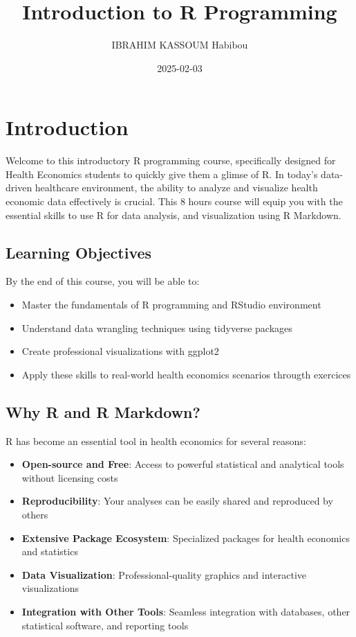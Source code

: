 \documentclass[
]{book}
\title{Introduction to R Programming}
\author{IBRAHIM KASSOUM Habibou}
\date{2025-02-03}
\providecommand{\tightlist}{%
  \setlength{\itemsep}{0pt}\setlength{\parskip}{0pt}}
\begin{document}
\maketitle

{
\setcounter{tocdepth}{1}
\tableofcontents
}
\chapter{Introduction}\label{introduction}

Welcome to this introductory R programming course, specifically designed for Health Economics students to quickly give them a glimse of R. In today's data-driven healthcare environment, the ability to analyze and visualize health economic data effectively is crucial. This 8 hours course will equip you with the essential skills to use R for data analysis, and visualization using R Markdown.

\section{Learning Objectives}\label{learning-objectives}

By the end of this course, you will be able to:

\begin{itemize}
\tightlist
\item
  Master the fundamentals of R programming and RStudio environment
\item
  Understand data wrangling techniques using tidyverse packages
\item
  Create professional visualizations with ggplot2
\item
  Apply these skills to real-world health economics scenarios througth exercices
\end{itemize}

\section{Why R and R Markdown?}\label{why-r-and-r-markdown}

R has become an essential tool in health economics for several reasons:

\begin{itemize}
\tightlist
\item
  \textbf{Open-source and Free}: Access to powerful statistical and analytical tools without licensing costs
\item
  \textbf{Reproducibility}: Your analyses can be easily shared and reproduced by others
\item
  \textbf{Extensive Package Ecosystem}: Specialized packages for health economics and statistics
\item
  \textbf{Data Visualization}: Professional-quality graphics and interactive visualizations
\item
  \textbf{Integration with Other Tools}: Seamless integration with databases, other statistical software, and reporting tools
\end{itemize}
\end{document}
